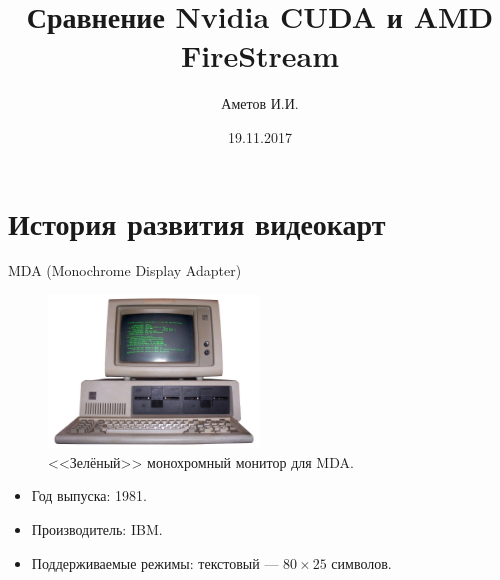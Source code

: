 \documentclass{beamer}
\title[Nvidia CUDA и AMD FireStream]{Сравнение Nvidia CUDA и AMD FireStream}
\author{Аметов И.И.}
\institute{Московский Технологический институт}
\date{19.11.2017}
\begin{document}
\def\figurename{Рисунок}
\def\tablename{Таблица}
\begin{frame}
  \titlepage
\end{frame}


\section{История развития видеокарт}

\begin{frame}{MDA (Monochrome Display Adapter)}

\begin{figure}
\center
\includegraphics[width=0.5\textwidth]{Images/IBM_PC_5150.jpg}
\caption{\label{fig:MDA}<<Зелёный>> монохромный монитор для MDA.}
\end{figure}

\begin{itemize}
  \item{ Год выпуска: 1981.}
  \item{Производитель: IBM.}
  \item{Поддерживаемые режимы: текстовый --- $80 \times 25$ символов.}
\end{itemize}



\end{frame}
\end{document}
